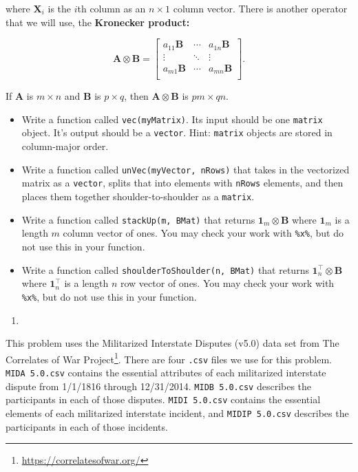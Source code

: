 \documentclass[
  12pt,
  krantz2]{krantz}
\providecommand{\tightlist}{%
  \setlength{\itemsep}{0pt}\setlength{\parskip}{0pt}}
\renewcommand{\href}[2]{#2\footnote{\url{#1}}}
\begin{document}
where \(\mathbf{X}_i\) is the \(i\)th column as an \(n \times 1\) column vector. There is another operator that we will use, the \textbf{Kronecker product:}

\begin{equation} 
\mathbf{A} \otimes \mathbf{B} = 
\begin{bmatrix}
a_{11} \mathbf{B} & \cdots & a_{1n} \mathbf{B} \\
\vdots & \ddots & \vdots \\
a_{m1} \mathbf{B} & \cdots & a_{mn} \mathbf{B} \\
\end{bmatrix}.
\end{equation}

If \(\mathbf{A}\) is \(m \times n\) and \(\mathbf{B}\) is \(p \times q\), then \(\mathbf{A} \otimes \mathbf{B}\) is \(pm \times qn\).

\begin{itemize}
\tightlist
\item
  Write a function called \texttt{vec(myMatrix)}. Its input should be one \texttt{matrix} object. It's output should be a \texttt{vector}. Hint: \texttt{matrix} objects are stored in column-major order.
\item
  Write a function called \texttt{unVec(myVector,\ nRows)} that takes in the vectorized matrix as a \texttt{vector}, splits that into elements with \texttt{nRows} elements, and then places them together shoulder-to-shoulder as a \texttt{matrix}.
\item
  Write a function called \texttt{stackUp(m,\ BMat)} that returns \(\mathbf{1}_m \otimes \mathbf{B}\) where \(\mathbf{1}_m\) is a length \(m\) column vector of ones. You may check your work with \texttt{\%x\%}, but do not use this in your function.
\item
  Write a function called \texttt{shoulderToShoulder(n,\ BMat)} that returns \(\mathbf{1}^\intercal_n \otimes \mathbf{B}\) where \(\mathbf{1}_n^\intercal\) is a length \(n\) row vector of ones. You may check your work with \texttt{\%x\%}, but do not use this in your function.
\end{itemize}

\begin{enumerate}
\def\labelenumi{\arabic{enumi}.}
\setcounter{enumi}{3}
\tightlist
\item
\end{enumerate}

This problem uses the Militarized Interstate Disputes (v5.0) \citep{mid5} data set from \href{https://correlatesofwar.org/}{The Correlates of War Project}. There are four \texttt{.csv} files we use for this problem. \texttt{MIDA\ 5.0.csv} contains the essential attributes of each militarized interstate dispute from 1/1/1816 through 12/31/2014. \texttt{MIDB\ 5.0.csv} describes the participants in each of those disputes. \texttt{MIDI\ 5.0.csv} contains the essential elements of each militarized interstate incident, and \texttt{MIDIP\ 5.0.csv} describes the participants in each of those incidents.
\end{document}
